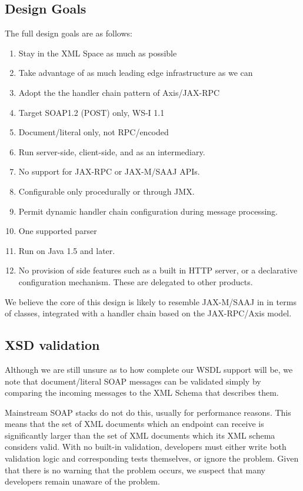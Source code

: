 \subsection{Design Goals}
\label{alpine:design}

The full design goals are as follows:

\begin{enumerate}

\item Stay in the XML Space as much as possible
\item Take advantage of as much leading edge infrastructure as we can
\item Adopt the the handler chain pattern of Axis/JAX-RPC
\item Target SOAP1.2 (POST) only, WS-I 1.1
\item Document/literal only, not RPC/encoded
\item Run server-side, client-side, and as an intermediary. 
\item No support for JAX-RPC or JAX-M/SAAJ APIs.
\item Configurable only procedurally or through JMX.
\item Permit dynamic handler chain configuration during message processing.
\item One supported parser %
\item Run on Java 1.5 and later. 

\item No provision of side features such as a built in HTTP server, or
a declarative configuration mechanism. These are delegated to other products.
\end{enumerate}

We believe the core of this design is likely to resemble JAX-M/SAAJ in
in terms of classes, integrated with a handler chain based on the
JAX-RPC/Axis model.

\subsection{XSD validation}
\label{alpine:validation}

Although we are still unsure as to how complete our WSDL support will
be, we note that document/literal SOAP messages can be validated
simply by comparing the incoming messages to the XML Schema that
describes them.

Mainstream SOAP stacks do not do this, usually for performance
reasons. This means that the set of XML documents which an endpoint
can receive is significantly larger than the set of XML documents
which its XML schema considers valid. With no built-in validation,
developers must either write both validation logic and corresponding
tests themselves, or ignore the problem. Given that there is no
warning that the problem occurs, we suspect that many developers
remain unaware of the problem.

